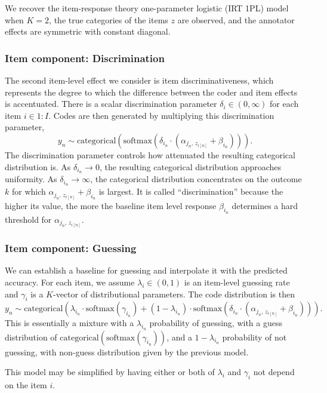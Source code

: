 \documentclass[10pt]{article}
\newcommand{\range}[2]{#1{:}#2}
\newcommand{\rng}[1]{\range{1}{#1}}
\begin{document}
We recover the item-response theory one-parameter logistic (IRT 1PL)
model when $K = 2$, the true categories of the items $z$ are
observed, and the annotator effects are symmetric with constant diagonal.

\subsubsection*{Item component: Discrimination}

The second item-level effect we consider is item discriminativeness,
which represents the degree to which the difference between the coder
and item effects is accentuated.  There is a scalar discrimination
parameter $\delta_i \in (0, \infty)$ for each item $i \in \rng{I}$.
Codes are then generated by multiplying this discrimination parameter,
\[
    y_n \sim \textrm{categorical}(\textrm{softmax}(\delta_{i_n} \cdot (\alpha_{j_n,\,
    z_{i[n]}} + \beta_{i_n}))).
\]
The discrimination parameter controls how attenuated the resulting
categorical distribution is. As 
$\delta_{i_n} \rightarrow 0$, the resulting categorical distribution
approaches uniformity. As $\delta_{i_n} \rightarrow \infty$, the
categorical distribution concentrates on the outcome $k$ for which
$\alpha_{j_n,\, z_{i[n]}} + \beta_{i_n}$ is largest. It is called
``discrimination'' because the higher its value, the more the baseline
item level response $\beta_{i_n}$ determines a hard threshold for
$\alpha_{j_n,\, z_{i[n]}}$.

\subsubsection*{Item component: Guessing}

We can establish a baseline for guessing and interpolate it with the
predicted accuracy.  For each item, we assume $\lambda_i \in (0, 1)$ is an
item-level guessing rate and $\gamma_i$ is a $K$-vector of distributional
parameters.  The code distribution is then
\[
  y_n \sim \textrm{categorical}(
  \lambda_{i_n} \cdot \textrm{softmax}(\gamma_{i_n})
  + (1 - \lambda_{i_n}) \cdot \textrm{softmax}(\delta_{i_n} \cdot (\alpha_{j_n,\,
    z_{i[n]}} + \beta_{i_n}))).
\]
This is essentially a mixture with a $\lambda_{i_n}$ probability of
guessing, with a guess distribution of
$\textrm{categorical}(\textrm{softmax}(\gamma_{i_n}))$, and
a $1 - \lambda_{i_n}$ probability of not guessing, with non-guess
distribution given by the previous model.  

This model may be simplified by having either or both of
$\lambda_{i}$ and $\gamma_{i}$ not depend on the item $i$.
\end{document}
